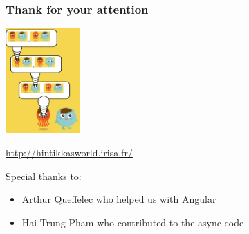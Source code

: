 \begin{frame}
\frametitle{Thank for your attention}

\begin{center}
\includegraphics[height=4cm]{images/hintikka_world_screenshot.png}

\url{http://hintikkasworld.irisa.fr/}

\vfill

\begin{block}{Special thanks to:}
\begin{itemize}
	\item Arthur Queffelec who helped us with Angular
	\item Hai Trung Pham who contributed to the async code
\end{itemize}
\end{block}

\end{center}

\end{frame}
